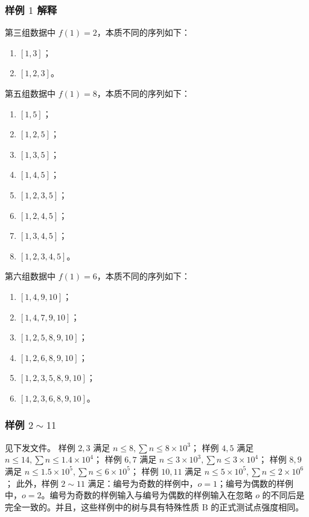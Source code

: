 \documentclass[12pt,a4paper,oneside]{ctexart}
\begin{document}
\subsubsection*{样例 $1$ 解释}
第三组数据中 $f(1) = 2$，本质不同的序列如下：
\begin{enumerate}
\item $[1,3]$；
\item $[1,2,3]$。
\end{enumerate}
第五组数据中 $f(1) = 8$，本质不同的序列如下：
\begin{enumerate}
\item $[1,5]$；
\item $[1,2,5]$；
\item $[1,3,5]$；
\item $[1,4,5]$；
\item $[1,2,3,5]$；
\item $[1,2,4,5]$；
\item $[1,3,4,5]$；
\item $[1,2,3,4,5]$。
\end{enumerate}
第六组数据中 $f(1) = 6$，本质不同的序列如下：
\begin{enumerate}
\item $[1,4,9,10]$；
\item $[1,4,7,9,10]$；
\item $[1,2,5,8,9,10]$；
\item $[1,2,6,8,9,10]$；
\item $[1,2,3,5,8,9,10]$；
\item $[1,2,3,6,8,9,10]$。
\end{enumerate}
\subsubsection*{样例 $2 \sim 11$}
见下发文件。
样例 $2,3$ 满足 $n \leq 8, \sum n \leq 8 \times 10^{3}$；
样例 $4,5$ 满足 $n \leq 14, \sum n \leq 1.4 \times 10^{4}$；
样例 $6,7$ 满足 $n \leq 3 \times 10^{3}, \sum n \leq 3 \times 10^{4}$；
样例 $8,9$ 满足 $n \leq 1.5 \times 10^{5}, \sum n \leq 6 \times 10^{5}$；
样例 $10,11$ 满足 $n \leq 5 \times 10^{5}, \sum n \leq 2 \times 10^{6}$；
此外，样例 $2 \sim 11$ 满足：编号为奇数的样例中，$o = 1$；编号为偶数的样例中，$o = 2$。编号为奇数的样例输入与编号为偶数的样例输入在忽略 $o$ 的不同后是完全一致的。并且，这些样例中的树与具有特殊性质 $\text{B}$ 的正式测试点强度相同。
\end{document}
